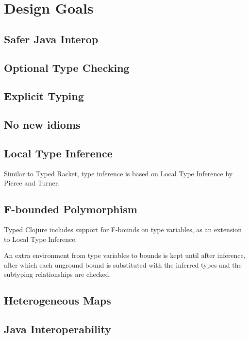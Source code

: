 \documentclass{cshonours}
\begin{document}
\chapter{Design Goals}

\section{Safer Java Interop}
\section{Optional Type Checking}
\section{Explicit Typing}
\section{No new idioms}

\section{Local Type Inference}

Similar to Typed Racket, type inference is based on Local Type Inference
by Pierce and Turner.

\section{F-bounded Polymorphism}

Typed Clojure includes support for F-bounds on type variables, as an extension
to Local Type Inference. 

An extra environment from type variables to bounds is kept until after inference,
after which each unground bound is substituted with the inferred types and the
subtyping relationships are checked.



\section{Heterogeneous Maps}

\section{Java Interoperability}
\end{document}
